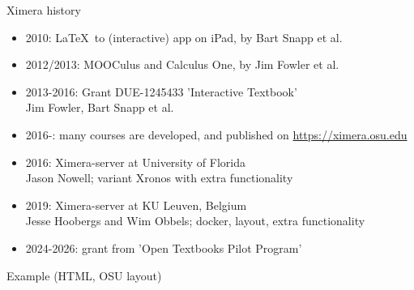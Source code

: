 \begin{frame}{Ximera history}
  \begin{itemize}[<+->]
    \item 2010: \LaTeX\ to (interactive) app on iPad, by Bart Snapp et al.
    \item 2012/2013: MOOCulus and Calculus One, by Jim Fowler et al.
    \item 2013-2016: Grant DUE-1245433  'Interactive Textbook' \\  Jim Fowler, Bart Snapp et al.
    \item 2016-: many courses are developed, and published on \url{https://ximera.osu.edu}
    \item 2016: Ximera-server at University of Florida \\ Jason Nowell; variant Xronos with extra functionality
    \item 2019: Ximera-server at KU Leuven, Belgium \\ Jesse Hoobergs and Wim Obbels; docker, layout, extra functionality
    \item 2024-2026: grant from 'Open Textbooks Pilot Program'
  \end{itemize}

\end{frame}

\begin{frame}[t]{Example (HTML, OSU layout)}
  \begin{center}
  \end{center}
\end{frame}

